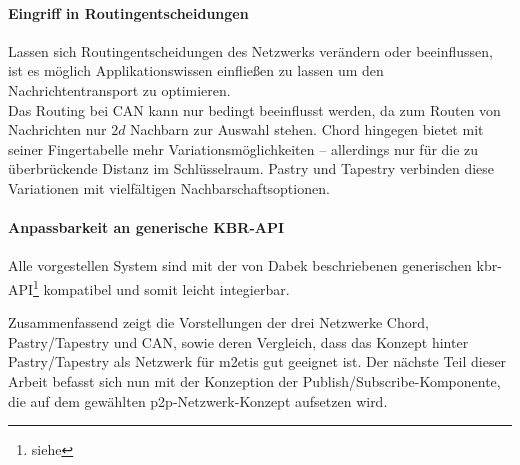 \paragraph{Eingriff in Routingentscheidungen} Lassen sich Routingentscheidungen des Netzwerks verändern oder beeinflussen, ist es möglich Applikationswissen einfließen zu lassen um den Nachrichtentransport zu optimieren.\\
Das Routing bei CAN kann nur bedingt beeinflusst werden, da zum Routen von Nachrichten nur $2d$ Nachbarn zur Auswahl stehen. Chord hingegen bietet mit seiner Fingertabelle mehr Variations\-möglichkeiten -- allerdings nur für die zu überbrückende Distanz im Schlüsselraum. Pastry und Tapes\-try verbinden diese Variationen mit vielfältigen Nachbarschaftsoptionen.

\paragraph{Anpassbarkeit an generische KBR-API}
Alle vorgestellen System sind mit der von Dabek beschriebenen generischen \ac{kbr}-API\footnote{siehe } kompatibel und somit leicht integierbar.

Zusammenfassend zeigt die Vorstellungen der drei Netzwerke Chord, Pastry/Tapestry und CAN, sowie deren Vergleich, dass  das Konzept hinter Pastry/Tapestry als Netzwerk für \ac{m2etis} gut geeignet ist.  Der nächste Teil dieser Arbeit befasst sich nun mit der Konzeption der Publish/Subscribe-Komponente, die auf dem gewählten p2p-Netzwerk-Konzept aufsetzen wird.
